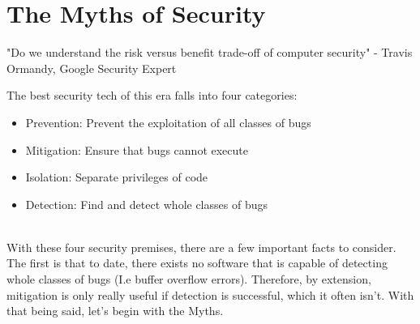 \documentclass{article}
\newcommand\tab[1][1cm]{\hspace*{#1}}
\begin{document}
\section{The Myths of Security}
\begin{center}
"Do we understand the risk versus benefit trade-off of computer security" - Travis Ormandy, Google Security Expert
\end{center}
\tab The best security tech of this era falls into four categories:
\\
\begin{itemize}
    \item Prevention: Prevent the exploitation of all classes of bugs
    \item Mitigation: Ensure that bugs cannot execute 
    \item Isolation: Separate privileges of code
    \item Detection: Find and detect whole classes of bugs
\end{itemize}
\\
\tab With these four security premises, there are a few important facts to consider. The first is that to date, there exists no software that is capable of detecting whole classes of bugs (I.e buffer overflow errors). Therefore, by extension, mitigation is only really useful if detection is successful, which it often isn't. With that being said, let's begin with the Myths.
\end{document}
